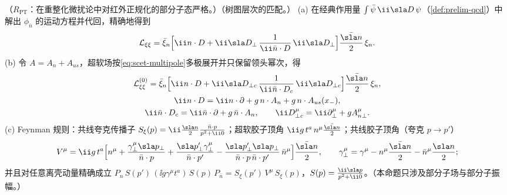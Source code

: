 \begin{proposition}\label{prop:scet-lagrangian}
（$R_{\mathrm{PT}}$：在重整化微扰论中对红外正规化的部分子态严格。）（树图层次的匹配。）
(a) 在经典作用量 $\int\bar\psi\,\ii\sla D\,\psi$（\cref{def:prelim-qcd}）中解出 $\phi_{\bar n}$ 的运动方程并代回，精确地得到
\begin{equation}\label{eq:scet-Lxixi-exact}
\mathcal L_{\xi\xi}=\bar\xi_n\Big[\ii n\cdot D+\ii\sla D_\perp\,\frac{1}{\ii\bar n\cdot D}\,\ii\sla D_\perp\Big]\frac{\bar{\sla n}}{2}\,\xi_n .
\end{equation}
(b) 令 $A=A_n+A_{us}$，超软场按\cref{eq:scet-multipole}多极展开并只保留领头幂次，得
\begin{equation}\label{eq:scet-L0xi}
\begin{gathered}
\mathcal L^{(0)}_{\xi\xi}=\bar\xi_n\Big[\ii n\cdot D+\ii\sla D_{\perp c}\,\frac{1}{\ii\bar n\cdot D_c}\,\ii\sla D_{\perp c}\Big]\frac{\bar{\sla n}}{2}\,\xi_n,\\
\ii n\cdot D=\ii n\cdot\partial+g\,n\cdot A_n+g\,n\cdot A_{us}(x_-),\\
\ii\bar n\cdot D_c=\ii\bar n\cdot\partial+g\,\bar n\cdot A_n,\qquad \ii D^\mu_{\perp c}=\ii\partial^\mu_\perp+gA^\mu_{n\perp}.
\end{gathered}
\end{equation}
(c) Feynman 规则：共线夸克传播子 $S_\xi(p)=\ii\frac{\sla n}{2}\frac{\bar n\cdot p}{p^2+\ii0}$；超软胶子顶角 $\ii g\,t^a\,n^\mu\frac{\bar{\sla n}}{2}$；共线胶子顶角（夸克 $p\to p'$）
\begin{equation}\label{eq:scet-collvertex}
V^\mu=\ii g\,t^a\Big[n^\mu+\frac{\gamma_\perp^\mu\sla p_\perp}{\bar n\cdot p}+\frac{\sla p'_\perp\gamma_\perp^\mu}{\bar n\cdot p'}-\frac{\sla p'_\perp\sla p_\perp}{\bar n\cdot p\,\bar n\cdot p'}\,\bar n^\mu\Big]\frac{\bar{\sla n}}{2},\qquad
\gamma_\perp^\mu=\gamma^\mu-n^\mu\frac{\bar{\sla n}}{2}-\bar n^\mu\frac{\sla n}{2};
\end{equation}
并且对任意离壳动量精确成立 $P_n\,S(p')\,(\ii g\gamma^\mu t^a)\,S(p)\,P_{\bar n}=S_\xi(p')\,V^\mu\,S_\xi(p)$，$S(p)=\frac{\ii\sla p}{p^2+\ii0}$。（本命题只涉及部分子场与部分子振幅。）
\end{proposition}

